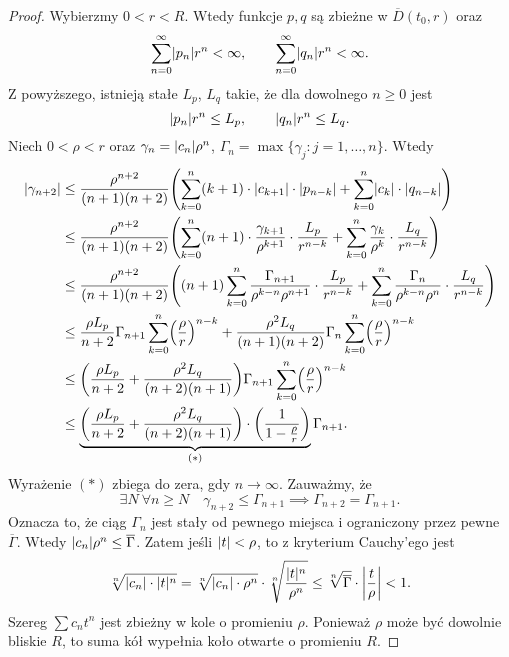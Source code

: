 \begin{proof}
  Wybierzmy $0 < r < R$. Wtedy funkcje $p,q$ są zbieżne w $\overline{D} (t_0,r)$ oraz
  \begin{equation*}
    \sum_{n=0}^{\infty} \abs{p_n} r^n < \infty, \qquad \sum_{n=0}^{\infty} \abs{q_n} r^n < \infty.
  \end{equation*}
  Z powyższego, istnieją stałe $L_p$, $L_q$ takie, że dla dowolnego $n \geq 0$ jest
  \begin{equation*}
    \abs{p_n} r^n \leq L_p, \qquad \abs{q_n} r^n \leq L_q.
  \end{equation*}
  Niech $0 < \rho < r$ oraz $\gamma_n = \abs{c_n} \rho^n$, $\Gamma_n = \max\{\gamma_j: j = 
  1,\ldots,n\}$. Wtedy
  \begin{align*}
    \abs{\gamma_{n+2}} &\leq \frac{\rho^{n+2}}{(n+1)(n+2)}
    \p*{ \sum_{k = 0}^{n} (k + 1) \cdot \abs{c_{k + 1}} \cdot \abs{p_{n - k}} + 
    \sum_{k = 0}^{n} \abs{c_k} \cdot \abs{q_{n - k}}} \\ &\leq
    \frac{\rho^{n+2}}{(n+1)(n+2)}
    \p*{ \sum_{k=0}^{n} (n+1) \cdot \frac{\gamma_{k+1}}{\rho^{k+1}} \cdot \frac{L_p}{r^{n-k}} + 
    \sum_{k=0}^{n} \frac{\gamma_k}{\rho^k} \cdot \frac{L_q}{r^{n-k}} } \\ &\leq 
    \frac{\rho^{n+2}}{(n+1)(n+2)}
    \p*{ (n+1) \sum_{k=0}^{n} \frac{\Gamma_{n+1}}{\rho^{k-n} \rho^{n+1}} \cdot 
    \frac{L_p}{r^{n-k}} +
    \sum_{k=0}^{n} \frac{\Gamma_n}{\rho^{k-n}\rho^{n}} \cdot \frac{L_q}{r^{n-k}} } \\ &\leq
    \frac{\rho L_p}{n+2} \Gamma_{n+1} \sum_{k=0}^{n} \p*{ \frac{\rho}{r} }^{n-k} + 
    \frac{\rho^2 L_q}{(n+1)(n+2)} \Gamma_n \sum_{k=0}^{n} \p*{ \frac{\rho}{r} }^{n-k} \\ &\leq
    \p*{ \frac{\rho L_p}{n+2} + \frac{\rho^2 L_q}{(n+2)(n+1)}} \Gamma_{n+1}
    \sum_{k=0}^n \p*{ \frac{\rho}{r} }^{n-k} \\ &\leq
    \underbrace{\p*{ \frac{\rho L_p}{n+2} + \frac{\rho^2 L_q}{(n+2)(n+1)}} \cdot \p*{\frac{1}{1 - 
    \frac{\rho}{r}}}}_{(\ast)} \Gamma_{n+1}.
  \end{align*}
  Wyrażenie $(\ast)$ zbiega do zera, gdy $n \to \infty$. Zauważmy, że
  \begin{equation*}
    \exists N \ \forall n \geq N \quad \gamma_{n+2} \leq \Gamma_{n+1} \implies \Gamma_{n+2} = 
    \Gamma_{n+1}.
  \end{equation*}
  Oznacza to, że ciąg $\Gamma_n$ jest stały od pewnego miejsca i ograniczony przez 
  pewne~$\overline{\Gamma}$. Wtedy $\abs{c_n}\rho^n \leq \overline{\Gamma}$. Zatem jeśli $\abs{t} < 
  \rho$, to z kryterium Cauchy'ego jest
  \begin{equation*}
    \sqrt[n]{\abs{c_n} \cdot \abs{t}^n} = \sqrt[n]{\abs{c_n} \cdot \rho^n} \cdot 
    \sqrt[n]{\frac{\abs{t}^n}{\rho^n}} \leq \sqrt[n]{\overline{\Gamma}} \cdot \abs*{\frac{t}{\rho}} 
    < 1.
  \end{equation*}
  Szereg $\sum c_n t^n$ jest zbieżny w kole o promieniu $\rho$. Ponieważ $\rho$ może być dowolnie 
  bliskie $R$, to suma kół wypełnia koło otwarte o promieniu $R$.
\end{proof}
